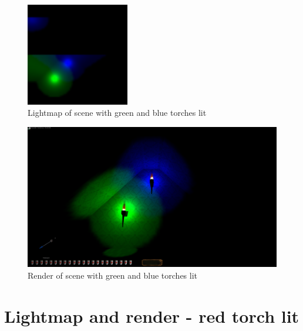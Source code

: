\begin{appendix}
\begin{figure}[htbp]
	\centering
		\includegraphics[width=0.40\textwidth]{img/PIX/gb.png}
	\caption[Lightmap of scene with green and blue torches lit]{Lightmap of scene with green and blue torches lit}
	\label{fig:LightmapGB}
\end{figure}
\begin{figure}[htbp]
	\centering
		\includegraphics[width=1.00\textwidth]{img/PIX/render_gb.png}
	\caption[Render of scene with green and blue torches lit]{Render of scene with green and blue torches lit}
	\label{fig:RenderGB}
\end{figure}

\clearpage
{}
\section{Lightmap and render - red torch lit} 



\end{appendix}
